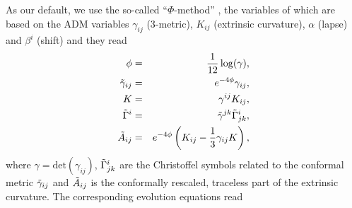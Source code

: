 \documentclass[useAMS,usenatbib]{iopart}
\begin{document}
As our default, we use the so-called  ``$\Phi$-method'' \cite{shibata95,baumgarte99}, the variables of which are based on the 
ADM variables $\gamma_{ij}$ (3-metric), $K_{ij}$ (extrinsic curvature),
$\alpha$ (lapse) and $\beta^{i}$ (shift) and they read
\begin{eqnarray}
  \phi & = & \frac{1}{12} \log(\gamma), \label{eq:bssn_phi}\\
  \tilde{\gamma}_{ij} & = & e^{-4\phi} \gamma_{ij}, \\
  K & = & \gamma^{ij} K_{ij}, \\
  \tilde{\Gamma}^{i} & = & \tilde{\gamma}^{jk} \tilde{\Gamma}^{i}_{jk}, \\
  \tilde{A}_{ij} & = & e^{-4\phi}\left ( K_{ij}-\frac{1}{3}\gamma_{ij} K\right )\label{eq:bssn_A},
\end{eqnarray}
where $\gamma = \mathrm{det}(\gamma_{ij})$,  $\tilde{\Gamma}^{i}_{jk}$ are the 
Christoffel symbols related to the conformal metric $\tilde{\gamma}_{ij}$ and $ \tilde{A}_{ij}$ is
the conformally rescaled, traceless part of the extrinsic curvature. The corresponding
evolution equations read
\end{document}
